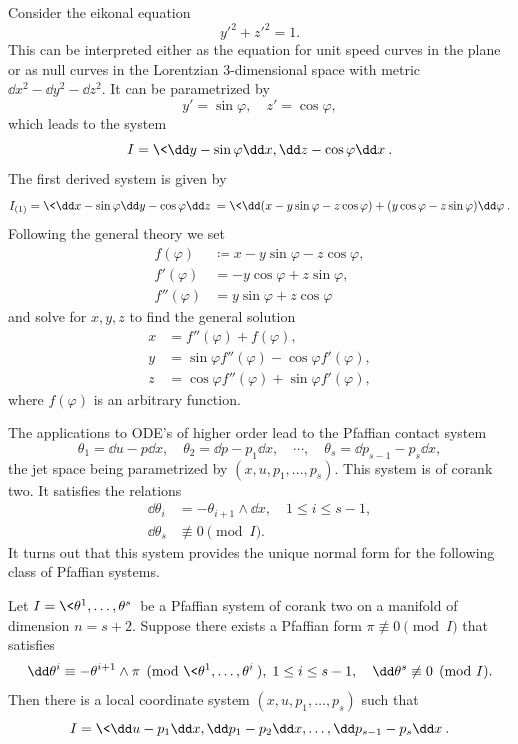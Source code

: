 \begin{example}
    Consider the eikonal equation
    \[y'^2+z'^2=1.\]
    This can be interpreted either as the equation for unit speed curves in the plane or as null curves in the Lorentzian $3$-dimensional space with metric $\dd x^2-\dd y^2-\dd z^2$. It can be parametrized by 
    \[y'=\sin\varphi ,\quad z'=\cos\varphi,\]
    which leads to the system 
    \[I=\<\dd y-\sin\varphi \dd x,\dd z-\cos\varphi \dd x\>.\]
    The first derived system is given by 
    \[I_{(1)}=\<\dd x-\sin\varphi \dd y-\cos\varphi \dd z\>=\<\dd (x-y\sin\varphi-z\cos\varphi)+(y\cos\varphi-z\sin\varphi)\dd\varphi\>.\]
    Following the general theory we set 
    \begin{align}
        f(\varphi)&\coloneqq x-y\sin\varphi-z\cos\varphi,\\
        f'(\varphi)&=-y\cos\varphi+z\sin\varphi,\\
        f''(\varphi)&=y\sin\varphi+z\cos\varphi
    \end{align} 
    and solve for $x,y,z$ to find the general solution
    \begin{align}
        x&= f''(\varphi)+f(\varphi),\\
        y&= \sin\varphi f''(\varphi)-\cos\varphi f'(\varphi),\\
        z&=\cos\varphi f''(\varphi)+\sin\varphi f'(\varphi),
    \end{align}
    where $f(\varphi)$ is an arbitrary function.
\end{example}

The applications to ODE's of higher order lead to the Pfaffian contact system 
\[\theta_1=\dd u-p\dd x,\quad \theta_2=\dd p-p_1\dd x,\quad\cdots,\quad \theta_{s}=\dd p_{s-1}-p_s\dd x,\]
the jet space being parametrized by $(x,u,p_1,\ldots,p_s)$. This system is of corank two. It satisfies the relations 
\begin{align}
    \dd \theta_i&=-\theta_{i+1}\wedge\dd x,\quad 1\leq i\leq s-1,\\
    \dd \theta_s&\not\equiv 0 \pmod{I}.
\end{align}
It turns out that this system provides the unique normal form for the following class of Pfaffian systems.

\begin{thm}\label{thm goursat}
    Let $I=\<\theta^1,\ldots,\theta^s\>$ be a Pfaffian system of corank two on a manifold of dimension $n=s+2$. Suppose there exists a Pfaffian form $\pi\not\equiv 0\pmod{I}$ that satisfies 
    \[\dd\theta^i\equiv -\theta^{i+1}\wedge \pi \pmod{\<\theta^1,\ldots,\theta^i\>},\; 1\leq i\leq s-1,\quad \dd\theta^s\not\equiv 0\pmod{I}.\label{eq 34 Bryant}\]
    Then there is a local coordinate system $(x,u,p_1,\ldots,p_s)$ such that 
    \[I=\<\dd u-p_1 \dd x,\dd p_1-p_2\dd x,\ldots, \dd p_{s-1}-p_s\dd x\>.\]
\end{thm}

